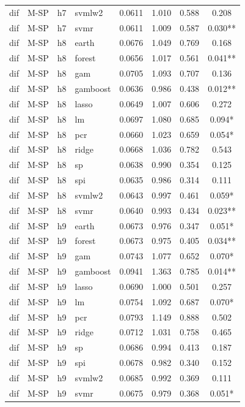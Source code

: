 \begin{ThreePartTable}
\begin{longtable}[t]{llclcccc}
dif & M-SP & h7 & svmlw2 & 0.0611 & 1.010 & 0.588 & 0.208\\
dif & M-SP & h7 & svmr & 0.0611 & 1.009 & 0.587 & 0.030**\\
\addlinespace
dif & M-SP & h8 & earth & 0.0676 & 1.049 & 0.769 & 0.168\\
dif & M-SP & h8 & forest & 0.0656 & 1.017 & 0.561 & 0.041**\\
dif & M-SP & h8 & gam & 0.0705 & 1.093 & 0.707 & 0.136\\
dif & M-SP & h8 & gamboost & 0.0636 & 0.986 & 0.438 & 0.012**\\
dif & M-SP & h8 & lasso & 0.0649 & 1.007 & 0.606 & 0.272\\
dif & M-SP & h8 & lm & 0.0697 & 1.080 & 0.685 & 0.094*\\
dif & M-SP & h8 & pcr & 0.0660 & 1.023 & 0.659 & 0.054*\\
dif & M-SP & h8 & ridge & 0.0668 & 1.036 & 0.782 & 0.543\\
dif & M-SP & h8 & sp & 0.0638 & 0.990 & 0.354 & 0.125\\
dif & M-SP & h8 & spi & 0.0635 & 0.986 & 0.314 & 0.111\\
dif & M-SP & h8 & svmlw2 & 0.0643 & 0.997 & 0.461 & 0.059*\\
dif & M-SP & h8 & svmr & 0.0640 & 0.993 & 0.434 & 0.023**\\
\addlinespace
dif & M-SP & h9 & earth & 0.0673 & 0.976 & 0.347 & 0.051*\\
dif & M-SP & h9 & forest & 0.0673 & 0.975 & 0.405 & 0.034**\\
dif & M-SP & h9 & gam & 0.0743 & 1.077 & 0.652 & 0.070*\\
dif & M-SP & h9 & gamboost & 0.0941 & 1.363 & 0.785 & 0.014**\\
dif & M-SP & h9 & lasso & 0.0690 & 1.000 & 0.501 & 0.257\\
dif & M-SP & h9 & lm & 0.0754 & 1.092 & 0.687 & 0.070*\\
dif & M-SP & h9 & pcr & 0.0793 & 1.149 & 0.888 & 0.502\\
dif & M-SP & h9 & ridge & 0.0712 & 1.031 & 0.758 & 0.465\\
dif & M-SP & h9 & sp & 0.0686 & 0.994 & 0.413 & 0.187\\
dif & M-SP & h9 & spi & 0.0678 & 0.982 & 0.340 & 0.152\\
dif & M-SP & h9 & svmlw2 & 0.0685 & 0.992 & 0.369 & 0.111\\
dif & M-SP & h9 & svmr & 0.0675 & 0.979 & 0.368 & 0.051*\\

\end{longtable}
\end{ThreePartTable}
